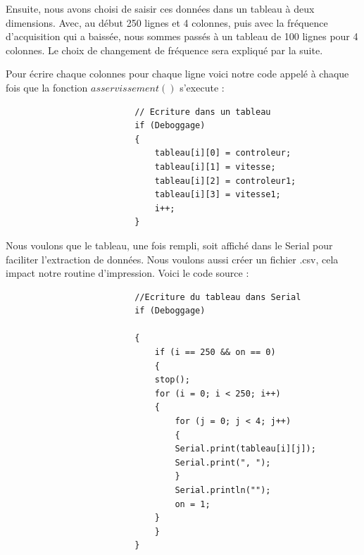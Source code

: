 \documentclass[
	a4paper,									%
	11pt,										%
	twoside,									%
	openright,									%
	notitlepage,									%
	parskip=half,								%
]{scrreprt}										%
\begin{document}
Ensuite, nous avons choisi de saisir ces données dans un tableau à deux dimensions. Avec, au début 250 lignes et 4 colonnes, puis
avec la fréquence d'acquisition qui a baissée, nous sommes passés à un tableau de 100 lignes pour 4 colonnes. Le choix de changement
de fréquence sera expliqué par la suite. \par

Pour écrire chaque colonnes pour chaque ligne voici notre code appelé à chaque fois que la fonction $asservissement()$ s'execute : 

\vspace{3em}
\begin{figure}[!ht]
    \centering
    \begin{verbatim}
                    // Ecriture dans un tableau
                    if (Deboggage)
                    {
                        tableau[i][0] = controleur;
                        tableau[i][1] = vitesse;
                        tableau[i][2] = controleur1;
                        tableau[i][3] = vitesse1;
                        i++;
                    }
    \end{verbatim}
\end{figure}

\newpage

Nous voulons que le tableau, une fois rempli, soit affiché dans le Serial pour faciliter l'extraction de données. Nous voulons aussi 
créer un fichier .csv, cela impact notre routine d'impression. Voici le code source : 
\vspace{3em}
\begin{figure}[!h]

    \begin{verbatim}
                    //Ecriture du tableau dans Serial
                    if (Deboggage)
                        
                    {
                        if (i == 250 && on == 0)
                        {
                        stop();
                        for (i = 0; i < 250; i++)
                        {
                            for (j = 0; j < 4; j++)
                            {
                            Serial.print(tableau[i][j]);
                            Serial.print(", ");
                            }
                            Serial.println("");
                            on = 1;
                        }
                        }
                    }
    \end{verbatim}
\end{figure}
\end{document}
